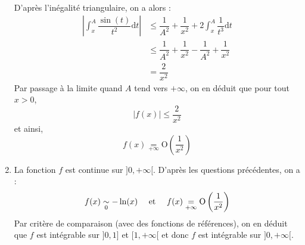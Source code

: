 \documentclass[a4paper,twoside,french,10pt]{VcCours}
\newcommand{\dx}{\text{d}x}
\newcommand{\dt}{\text{d}t}
\begin{document}
\begin{enumerate}
\begin{align*}
  \end{align*}
 D'après l'inégalité triangulaire, on a alors :
 \begin{align*}
 \left\vert  \int_{x}^A \dfrac{\sin(t)}{t^2} \dt \right\vert & \leq \dfrac{1}{A^2} + \dfrac{1}{x^2} + 2 \int_{x}^A \dfrac{1}{t^3} \dt  \\
 & \leq \dfrac{1}{A^2} + \dfrac{1}{x^2} - \dfrac{1}{A^2} + \dfrac{1}{x^2}  \\
 & = \dfrac{2}{x^2}
 \end{align*}
 Par passage à la limite quand $A$ tend vers $+ \infty$, on en déduit que pour tout $x>0$,
 $$ \vert f(x) \vert \leq \dfrac{2}{x^2}$$
 et ainsi,
$$f(x) \underset{+ \infty}{=} \textrm{O} \left( \dfrac{1}{x^2} \right) $$
\item La fonction $f$ est continue sur $]0, + \infty[$. D'après les questions précédentes, on a :
$$ f(x) \underset{0}{\sim} -\ln(x) \quad \hbox{ et } \quad f(x) \underset{+ \infty}{=} \textrm{O} \left( \dfrac{1}{x^2} \right)$$
Par critère de comparaison (avec des fonctions de références), on en déduit que $f$ est intégrable sur $]0,1]$ et $[1, + \infty[$ et donc $f$ est intégrable sur $]0, + \infty[$.
\end{enumerate}





%
%
\end{document}
